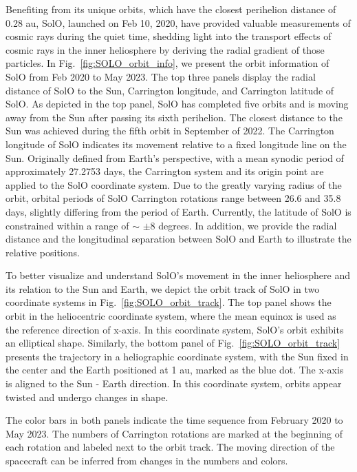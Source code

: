 Benefiting from its unique orbits, which have the closest perihelion distance of 0.28 au, \ac{SolO}, launched on Feb 10, 2020, have provided valuable measurements of cosmic rays during the quiet time, shedding light into the transport effects of cosmic rays in the inner heliosphere by deriving the radial gradient of those particles.
In Fig.~\ref{fig:SOLO_orbit_info}, we present the orbit information of \ac{SolO} from Feb 2020 to May 2023. The top three panels display the radial distance of \ac{SolO} to the Sun, Carrington longitude, and Carrington latitude of \ac{SolO}. As depicted in the top panel, \ac{SolO} has completed five orbits and is moving away from the Sun after passing its sixth perihelion. The closest distance to the Sun was achieved during the fifth orbit in September of 2022. 
The Carrington longitude of \ac{SolO} indicates its movement relative to a fixed longitude line on the Sun. Originally defined from Earth's perspective, with a mean synodic period of approximately 27.2753 days, the Carrington system and its origin point are applied to the \ac{SolO} coordinate system. 
Due to the greatly varying radius of the orbit, orbital periods of \ac{SolO} Carrington rotations range between 26.6 and 35.8 days, slightly differing from the period of Earth. Currently, the latitude of \ac{SolO} is constrained within a range of $\sim$ $\pm$8 degrees.
In addition, we provide the radial distance and the longitudinal separation between \ac{SolO} and Earth to illustrate the relative positions.

To better visualize and understand \ac{SolO}'s movement in the inner heliosphere and its relation to the Sun and Earth, we depict the orbit track of \ac{SolO} in two coordinate systems in Fig.~\ref{fig:SOLO_orbit_track}. The top panel shows the orbit in the heliocentric coordinate system, where the mean equinox is used as the reference direction of x-axis. In this coordinate system, \ac{SolO}'s orbit exhibits an elliptical shape. Similarly, the bottom panel of Fig.~\ref{fig:SOLO_orbit_track} presents the trajectory in a heliographic coordinate system, with the Sun fixed in the center and the Earth positioned at 1 au, marked as the blue dot. The x-axis is aligned to the Sun - Earth direction. In this coordinate system, orbits appear twisted and undergo changes in shape.

The color bars in both panels indicate the time sequence from February 2020 to May 2023. The numbers of Carrington rotations are marked at the beginning of each rotation and labeled next to the orbit track. The moving direction of the spacecraft can be inferred from changes in the numbers and colors.


